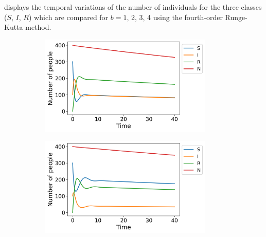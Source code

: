 \documentclass[../main.tex]{subfiles}
\begin{document}
\iffalse
{} displays the temporal variations of the number of individuals for the three classes ($S$, $I$, $R$) which are compared for $b=1$, 2, 3, 4 using the fourth-order Runge-Kutta method. 

\begin{figure}[htb!]
    \centering
    \begin{subfigure}[b]{0.475\textwidth}
    \centering
    \includegraphics[width=0.9\textwidth]{../figures/SIRS_vital_rk4_b=1.png}
    \caption{}
    \label{fig:vital_b=1}
    \end{subfigure}
    \quad
    \begin{subfigure}[b]{0.475\textwidth}
    \includegraphics[width=0.9\textwidth]{../figures/SIRS_vital_rk4_b=2.png}
    \caption{}
    \label{fig:vital_b=2}
    \end{subfigure}
    

\end{figure}
\end{document}
